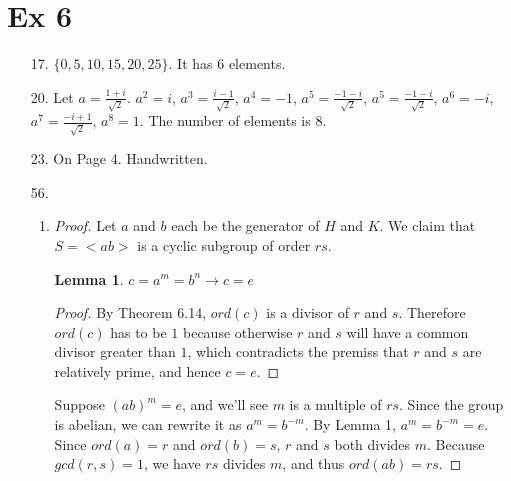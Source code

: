 \documentclass{article}
\newtheorem{lemma}{Lemma}
\begin{document}
\section*{Ex 6}
\begin{itemize}
\item [17.] $\{0,5,10,15,20,25\}$. It has $6$ elements.
\item [20.] Let $a = \frac{1+i}{\sqrt{2}}$.
  $a^2=i$, $a^3=\frac{i-1}{\sqrt{2}}$, $a^4=-1$,
  $a^5=\frac{-1-i}{\sqrt{2}}$, $a^5=\frac{-1-i}{\sqrt{2}}$, $a^6=-i$,
  $a^7=\frac{-i+1}{\sqrt{2}}$, $a^8=1$. The number of elements is $8$.
\item [23.]
  On Page 4. Handwritten.
\item [56.]
  \begin{enumerate}[label=\alph*.]
  \item
    \begin{proof}
      Let $a$ and $b$ each be the generator of $H$ and $K$.  We claim
      that $S=<ab>$ is a cyclic subgroup of order $rs$.

    \begin{lemma}
      $c= a^m = b^n \rightarrow c = e$
    \end{lemma}
    \begin{proof}
      By Theorem 6.14,
      $ord(c)$ is a divisor of $r$ and $s$. Therefore $ord(c)$ has to
      be $1$ because otherwise $r$ and $s$ will have a common divisor
      greater than $1$, which contradicts the premiss that $r$ and $s$
      are relatively prime, and hence $c=e$.
    \end{proof}
    Suppose $(ab)^m = e$, and we'll see $m$ is a multiple of $rs$. Since the group is abelian, we can rewrite
    it as $a^m = b^{-m}$. By Lemma 1, $a^m=b^{-m}=e$. Since $ord(a)=r$
    and $ord(b)=s$, $r$ and $s$ both divides $m$. Because $gcd(r,s)=1$,
    we have $rs$ divides $m$, and thus $ord(ab)=rs$.

  \end{proof}
  \end{enumerate}
\end{itemize}
\end{document}
